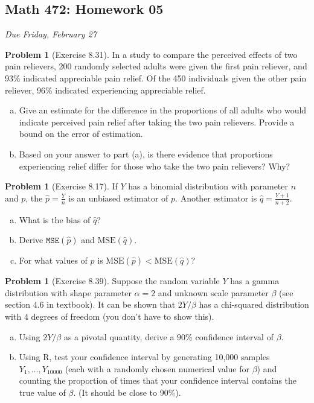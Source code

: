 \documentclass[10pt]{article}
\theoremstyle{definition}
\newtheorem{problem}[theorem]{Problem}
\newcommand{\1}[1]{\textbf{1}_{\left[#1\right]}} %
\begin{document}
\begin{center}
  \section*{Math 472: Homework 05}
  \textit{Due Friday, February 27}
\end{center}


\begin{problem}[Exercise 8.31]
  In a study to compare the perceived effects of two pain relievers, 200 randomly selected
adults were given the ﬁrst pain reliever, and 93\% indicated appreciable pain relief. Of the 450
individuals given the other pain reliever, 96\% indicated experiencing
appreciable relief.
\begin{enumerate}[(a)]
  \item Give an estimate for the difference in the proportions of all adults who would indicate
  perceived pain relief after taking the two pain relievers. Provide a bound on the error of
  estimation.
  \item Based on your answer to part (a), is there evidence that proportions experiencing relief
  differ for those who take the two pain relievers? Why?
\end{enumerate}
\end{problem}

\begin{problem}[Exercise 8.17]
  If $Y$ has a binomial distribution with parameter $n$ and $p$, the
  $\widehat{p}=\frac{Y}{n}$ is an unbiased estimator of $p$. Another estimator
  is $\widehat{q}=\frac{Y+1}{n+2}$.
  \begin{enumerate}[(a)]
    \item What is the bias of $\widehat{q}$?
    \item Derive $\mathtt{MSE}(\widehat{p})$ and $\text{MSE}(\widehat{q})$.
    \item For what values of $p$ is $\text{MSE}(\widehat{p})< \text{MSE}(\widehat{q})$?
  \end{enumerate}
\end{problem}

\begin{problem}[Exercise 8.39]
  Suppose the random variable $Y$ has a gamma distribution with shape parameter
  $\alpha=2$ and unknown scale parameter $\beta$ (see section 4.6 in
  textbook). It can be shown that $2Y/\beta$ has a chi-squared distribution with 4
  degrees of freedom (you don't have to show this).

  \begin{enumerate}[(a)]
    \item Using $2Y/\beta$ as a pivotal quantity, derive a $90\%$ confidence interval
    of $\beta$.
    \item Using \textrm{R}, test your confidence interval by generating 10,000
    samples $Y_{1},\ldots,Y_{10000}$ (each with a randomly chosen numerical
    value for $\beta$) and counting the proportion of times that your
    confidence interval contains the true value of $\beta$. (It should be
    close to 90\%).
  \end{enumerate}
\end{problem}
\end{document}
